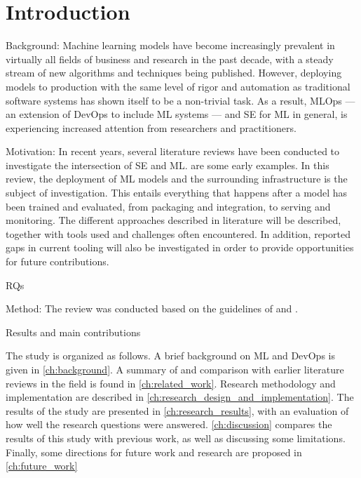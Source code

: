 \chapter{Introduction}
\label{ch:introduction}
Background:
Machine learning models have become increasingly prevalent in virtually all fields of business and research in the past decade, with a steady stream of new algorithms and techniques being published.
However, deploying models to production with the same level of rigor and automation as traditional software systems has shown itself to be a non-trivial task.
As a result, MLOps --- an extension of DevOps to include ML systems --- and SE for ML in general, is experiencing increased attention from researchers and practitioners.

Motivation:
In recent years, several literature reviews have been conducted to investigate the intersection of SE and ML.
\cite{Baier2019, Kumeno2020} are some early examples.
In this review, the deployment of ML models and the surrounding infrastructure is the subject of investigation.
This entails everything that happens after a model has been trained and evaluated, from packaging and integration, to serving and monitoring.
The different approaches described in literature will be described, together with tools used and challenges often encountered.
In addition, reported gaps in current tooling will also be investigated in order to provide opportunities for future contributions.

RQs

Method:
The review was conducted based on the guidelines of \cite{Kitchenham07guidelinesfor} and \cite{Wohlin2014}.

Results and main contributions

The study is organized as follows.
A brief background on ML and DevOps is given in \cref{ch:background}.
A summary of and comparison with earlier literature reviews in the field is found in \cref{ch:related_work}.
Research methodology and implementation are described in \cref{ch:research_design_and_implementation}.
The results of the study are presented in \cref{ch:research_results}, with an evaluation of how well the research questions were answered.
\cref{ch:discussion} compares the results of this study with previous work, as well as discussing some limitations.
Finally, some directions for future work and research are proposed in \cref{ch:future_work}
